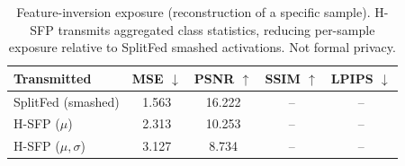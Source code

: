 \begin{table}[t]
\centering
\caption{Feature-inversion exposure (reconstruction of a specific sample). H-SFP transmits aggregated class statistics, reducing per-sample exposure relative to SplitFed smashed activations. Not formal privacy.}
\label{tab:inversion}
\begin{tabular}{lcccc}
\toprule
Transmitted & MSE $\downarrow$ & PSNR $\uparrow$ & SSIM $\uparrow$ & LPIPS $\downarrow$ \\
\midrule
SplitFed (smashed) & 1.563 & 16.222 & -- & -- \\
H-SFP ($\mu$) & 2.313 & 10.253 & -- & -- \\
H-SFP ($\mu,\sigma$) & 3.127 & 8.734 & -- & -- \\
\bottomrule
\end{tabular}
\end{table}
